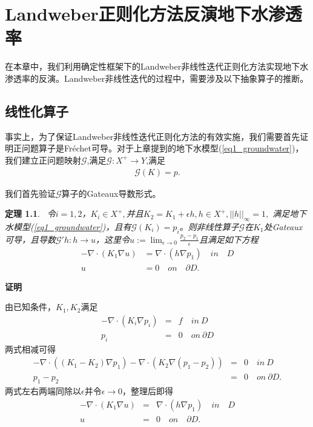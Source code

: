 \documentclass[a4paper,12pt,oneside,CJK]{cctbook}
\newtheorem{thm}  {\indent 定理}[section]
\theoremstyle{definition}
\numberwithin{equation}{section}
\begin{document}
\chapter{Landweber正则化方法反演地下水渗透率}
在本章中，我们利用确定性框架下的Landweber非线性迭代正则化方法实现地下水渗透率的反演。Landweber非线性迭代的过程中，需要涉及以下抽象算子的推断。
\section{线性化算子}
事实上，为了保证Landweber非线性迭代正则化方法的有效实施，我们需要首先证明正问题算子是Fr\'{e}chet可导。对于上章提到的地下水模型(\ref{eq1_groundwater})，
我们建立正问题映射$\mathcal{G}$,满足$\mathcal{G}:X^+\rightarrow Y$,满足
\begin{eqnarray}
   \mathcal{G}(K)=p.
\end{eqnarray}

我们首先验证$\mathcal{G}$算子的Gateaux导数形式。
\begin{thm}\label{thm2_Fderi}~令$i=1,2$，$K_i\in X^+,$并且$K_2=K_1+\epsilon h,h\in X^+,||h||_{\infty}=1,$
满足地下水模型(\ref{eq1_groundwater})，且有$\mathcal{G}(K_i) = p_i$。则非线性算子$\mathcal{G}$在$K_1$处Gateaux可导，且导数$\mathcal{G}' h : h \rightarrow u$，这里令$u:=\lim_{\epsilon\rightarrow 0}\frac{p_2-p_1}{\epsilon}$且满足如下方程
\begin{align}\label{eq2_Fderi}
    -\nabla\cdot(K_1\nabla u)&=\nabla\cdot(h\nabla p_1) \quad in\quad D\\
     u&=0\quad on \quad \partial D.
\end{align}
\end{thm}

\textbf{证明}

由已知条件，$K_1,K_2$满足
\begin{eqnarray*}
   -\nabla\cdot(K_i\nabla p_i)&=&f \quad in~D\\
   p_i&=&0\quad on ~\partial D
\end{eqnarray*}
两式相减可得
\begin{eqnarray*}
   -\nabla\cdot((K_1-K_2)\nabla p_1)-\nabla\cdot(K_2\nabla (p_1-p_2))&= & 0 \quad in~D \\
   p_1-p_2& = & 0 \quad on ~\partial D.
\end{eqnarray*}
两式左右两端同除以$\epsilon$并令$\epsilon\rightarrow 0$，整理后即得
\begin{eqnarray*}
    -\nabla\cdot(K_1\nabla u)&=&\nabla\cdot(h\nabla p_1) \quad in\quad D\\
     u&=&0\quad on \quad \partial D.
\end{eqnarray*}
\end{document}
